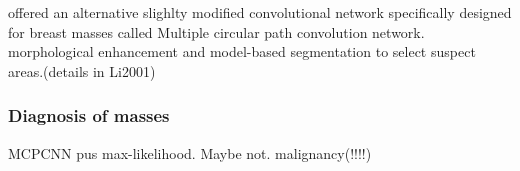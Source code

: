 
\begin{comment} Lo2002
- "In short, the results of these detection programs indicate that a high true-positive (TP) rate can be obtained at the expense of two or three false-positive (FP) detections per mammogram."
- model-based image segmentation: enhancement and model selection
- Backrground removal via morpholfical features
- Segmentation via FGGM and CBRl methods
- 3143 possible tumors: 181 were tumors (segmentation missed 5 tumors) from 200 mammograms.
- divide the image from the center in 36 pizza slices. (look at Fig. 5). compute 4 featrures per each.
- 1-D convolutional network where input has size 36x4(each of the 4 feature from the 36 regions) and filter size in hidden layer is size 5, stride 1.
- in the hidden units, the fully connnected paths join the NC paths and the SC paths. then fully connected to outputs.
\end{comment}
\cite{Lo2002} offered an alternative slighlty modified convolutional network specifically designed for breast masses called Multiple circular path convolution network.
morphological enhancement and model-based segmentation to select suspect areas.(details in Li2001)

\subsubsection{Diagnosis of masses}
MCPCNN pus max-likelihood. Maybe not. malignancy(!!!!)





